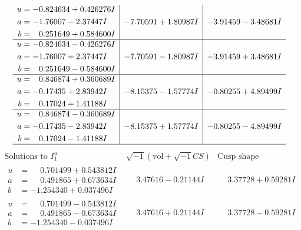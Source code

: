 \documentclass[1p]{elsarticle_modified}
\theoremstyle{definition}
\newcommand{\I}{\sqrt{-1}}
\begin{document}
$$\begin{array}{c|c|c}
\begin{aligned}
u &= -0.824634 + 0.426276 I \\
a &= -1.76007 - 2.37447 I \\
b &= \phantom{-}0.251649 + 0.584600 I\end{aligned}
 & -7.70591 + 1.80987 I & -3.91459 - 3.48681 I \\ \hline\begin{aligned}
u &= -0.824634 - 0.426276 I \\
a &= -1.76007 + 2.37447 I \\
b &= \phantom{-}0.251649 - 0.584600 I\end{aligned}
 & -7.70591 - 1.80987 I & -3.91459 + 3.48681 I \\ \hline\begin{aligned}
u &= \phantom{-}0.846874 + 0.360689 I \\
a &= -0.17435 + 2.83942 I \\
b &= \phantom{-}0.17024 + 1.41188 I\end{aligned}
 & -8.15375 - 1.57774 I & -0.80255 + 4.89499 I \\ \hline\begin{aligned}
u &= \phantom{-}0.846874 - 0.360689 I \\
a &= -0.17435 - 2.83942 I \\
b &= \phantom{-}0.17024 - 1.41188 I\end{aligned}
 & -8.15375 + 1.57774 I & -0.80255 - 4.89499 I\\
 \hline 
 \end{array}$$\newpage$$\begin{array}{c|c|c}  
\text{Solutions to }I^u_{1}& \I (\text{vol} + \sqrt{-1}CS) & \text{Cusp shape}\\
 \hline 
\begin{aligned}
u &= \phantom{-}0.701499 + 0.543812 I \\
a &= \phantom{-}0.491865 + 0.673634 I \\
b &= -1.254340 + 0.037496 I\end{aligned}
 & \phantom{-}3.47616 - 0.21144 I & \phantom{-}3.37728 + 0.59281 I \\ \hline\begin{aligned}
u &= \phantom{-}0.701499 - 0.543812 I \\
a &= \phantom{-}0.491865 - 0.673634 I \\
b &= -1.254340 - 0.037496 I\end{aligned}
 & \phantom{-}3.47616 + 0.21144 I & \phantom{-}3.37728 - 0.59281 I \\ \hline\begin{aligned}

\end{aligned}
\end{array}$$
\end{document}
